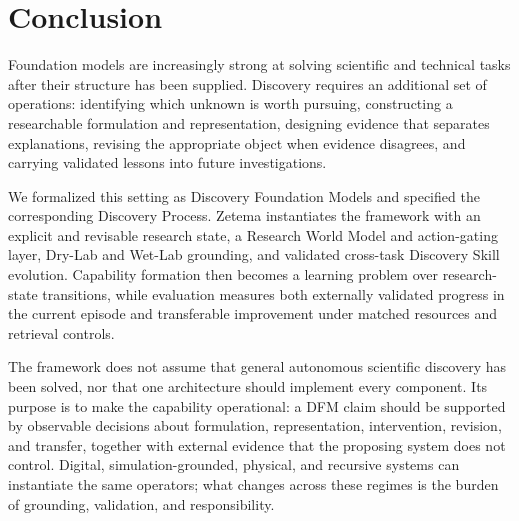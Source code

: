 \documentclass[11pt, a4paper, copyright]{google}
\begin{document}
\section{Conclusion}
\label{sec:conclusion}

Foundation models are increasingly strong at solving scientific and technical tasks after their structure has been supplied. Discovery requires an additional set of operations: identifying which unknown is worth pursuing, constructing a researchable formulation and representation, designing evidence that separates explanations, revising the appropriate object when evidence disagrees, and carrying validated lessons into future investigations.

We formalized this setting as Discovery Foundation Models and specified the corresponding Discovery Process. Zetema instantiates the framework with an explicit and revisable research state, a Research World Model and action-gating layer, Dry-Lab and Wet-Lab grounding, and validated cross-task Discovery Skill evolution. Capability formation then becomes a learning problem over research-state transitions, while evaluation measures both externally validated progress in the current episode and transferable improvement under matched resources and retrieval controls.

The framework does not assume that general autonomous scientific discovery has been solved, nor that one architecture should implement every component. Its purpose is to make the capability operational: a DFM claim should be supported by observable decisions about formulation, representation, intervention, revision, and transfer, together with external evidence that the proposing system does not control. Digital, simulation-grounded, physical, and recursive systems can instantiate the same operators; what changes across these regimes is the burden of grounding, validation, and responsibility.




\newpage
\appendix
\end{document}
